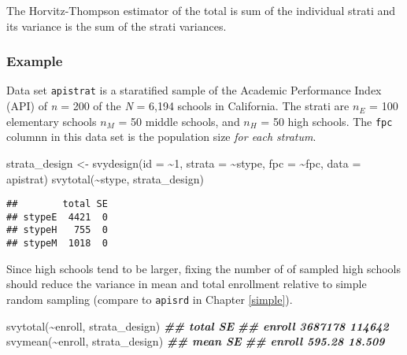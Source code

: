 \documentclass[
]{book}
\newenvironment{Shaded}{\begin{snugshade}}{\end{snugshade}}
\newcommand{\AttributeTok}[1]{\textcolor[rgb]{0.77,0.63,0.00}{#1}}
\newcommand{\DecValTok}[1]{\textcolor[rgb]{0.00,0.00,0.81}{#1}}
\newcommand{\DocumentationTok}[1]{\textcolor[rgb]{0.56,0.35,0.01}{\textbf{\textit{#1}}}}
\newcommand{\FunctionTok}[1]{\textcolor[rgb]{0.00,0.00,0.00}{#1}}
\newcommand{\NormalTok}[1]{#1}
\newcommand{\OtherTok}[1]{\textcolor[rgb]{0.56,0.35,0.01}{#1}}
\newcommand{\SpecialCharTok}[1]{\textcolor[rgb]{0.00,0.00,0.00}{#1}}
\theoremstyle{definition}
\theoremstyle{definition}
\theoremstyle{definition}
\theoremstyle{definition}
\theoremstyle{remark}
\begin{document}
The Horvitz-Thompson estimator of the total is sum of the individual strati and its variance is the sum of the strati variances.

\hypertarget{example-1}{%
\subsubsection*{Example}\label{example-1}}

Data set \texttt{apistrat} is a staratified sample of the Academic Performance Index (API) of \emph{n} = 200 of the \emph{N} = 6,194 schools in California. The strati are \(n_E\) = 100 elementary schools \(n_M\) = 50 middle schools, and \(n_H\) = 50 high schools. The \texttt{fpc} columnn in this data set is the population size \emph{for each stratum}.

\begin{Shaded}
\begin{Highlighting}[]
\NormalTok{strata\_design }\OtherTok{\textless{}{-}} \FunctionTok{svydesign}\NormalTok{(}\AttributeTok{id =} \SpecialCharTok{\textasciitilde{}}\DecValTok{1}\NormalTok{, }\AttributeTok{strata =} \SpecialCharTok{\textasciitilde{}}\NormalTok{stype, }\AttributeTok{fpc =} \SpecialCharTok{\textasciitilde{}}\NormalTok{fpc, }\AttributeTok{data =}\NormalTok{ apistrat)}
\FunctionTok{svytotal}\NormalTok{(}\SpecialCharTok{\textasciitilde{}}\NormalTok{stype, strata\_design)}
\end{Highlighting}
\end{Shaded}

\begin{verbatim}
##        total SE
## stypeE  4421  0
## stypeH   755  0
## stypeM  1018  0
\end{verbatim}

Since high schools tend to be larger, fixing the number of of sampled high schools should reduce the variance in mean and total enrollment relative to simple random sampling (compare to \texttt{apisrd} in Chapter \ref{simple}).

\begin{Shaded}
\begin{Highlighting}[]
\FunctionTok{svytotal}\NormalTok{(}\SpecialCharTok{\textasciitilde{}}\NormalTok{enroll, strata\_design)}
\DocumentationTok{\#\#          total     SE}
\DocumentationTok{\#\# enroll 3687178 114642}
\FunctionTok{svymean}\NormalTok{(}\SpecialCharTok{\textasciitilde{}}\NormalTok{enroll, strata\_design)}
\DocumentationTok{\#\#          mean     SE}
\DocumentationTok{\#\# enroll 595.28 18.509}
\end{Highlighting}
\end{Shaded}
\end{document}

